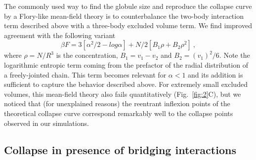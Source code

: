 \documentclass[
preprint,
a4paper,
12pt,
superscriptaddress,
pre]{revtex4}
\begin{document}
% 
The commonly used way to find the globule size and reproduce the
collapse curve by a Flory-like mean-field theory is to counterbalance
the two-body interaction term described above with a three-body
excluded volume term. We find improved agreement with the following
variant~\cite{DeGennes1975}
  \begin{equation}
    \beta F = 3 [\alpha^2/2 - log \alpha] + N/2 [B_1 \rho  + B_2 \rho^2 ] \ ,
    \label{eq:deg_mfield}
\end{equation}
where $\rho = N/R^3$ is the concentration, $B_1 = v_1 - v_2$ and $B_2
= (v_1)^2 / 6$. Note the logarithmic entropic term
coming from the prefactor of the radial distribution of a
freely-jointed chain.
%
%
This term becomes relevant for $\alpha < 1$ and its
addition is sufficient to capture the behavior described above.  For
extremely small excluded volumes, this mean-field theory also fails
quantitatively (Fig.~\ref{fig:2}C), but we noticed that (for
unexplained reasons) the reentrant inflexion points of the theoretical
collapse curve correspond remarkably well to the collapse points
observed in our simulations.



%
%
%


\subsection*{Collapse in presence of bridging interactions}
\end{document}
